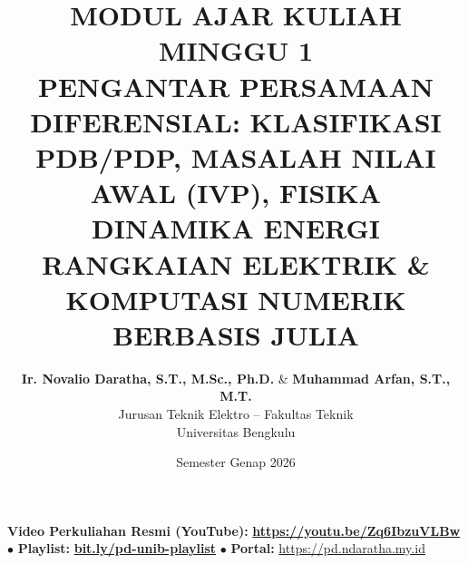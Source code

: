 \documentclass[11pt,a4paper]{article}
\title{\textbf{\Large MODUL AJAR KULIAH MINGGU 1}\\[0.3cm]
\textbf{\LARGE PENGANTAR PERSAMAAN DIFERENSIAL: KLASIFIKASI PDB/PDP, MASALAH NILAI AWAL (IVP), FISIKA DINAMIKA ENERGI RANGKAIAN ELEKTRIK \& KOMPUTASI NUMERIK BERBASIS JULIA}}
\author{\textbf{Ir. Novalio Daratha, S.T., M.Sc., Ph.D.} \& \textbf{Muhammad Arfan, S.T., M.T.} \\ 
Jurusan Teknik Elektro -- Fakultas Teknik \\ 
Universitas Bengkulu}
\date{Semester Genap 2026}
\theoremstyle{definition}
\begin{document}
\maketitle
\begin{center}
  \vspace{-0.25cm}
  \begin{tcolorbox}[colback=red!4!white,colframe=red!75!black,boxrule=0.5pt,arc=2pt,left=6pt,right=6pt,top=3pt,bottom=3pt,width=0.98\textwidth]
    \centering\footnotesize
    \textbf{Video Perkuliahan Resmi (YouTube):} {\color{red!80!black}\textbf{\url{https://youtu.be/Zq6IbzuVLBw}}} \quad $\bullet$ \quad \textbf{Playlist:} \href{https://www.youtube.com/playlist?list=PLS5oOZWXZeTw}{\color{blue!80!black}\textbf{bit.ly/pd-unib-playlist}} \quad $\bullet$ \quad \textbf{Portal:} \url{https://pd.ndaratha.my.id}
  \end{tcolorbox}
  \vspace{-0.15cm}
\end{center}
\end{document}
